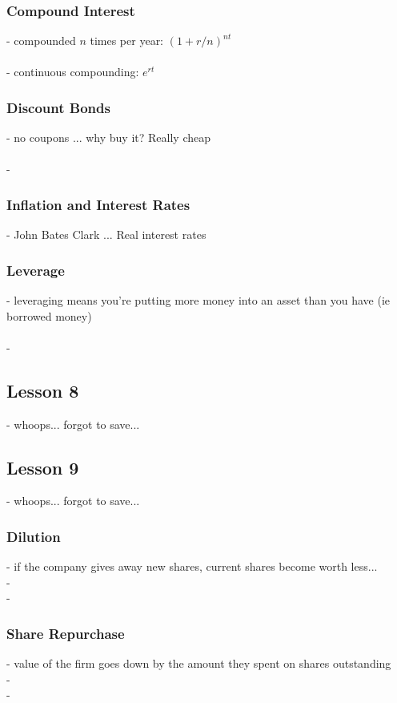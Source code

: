 \documentclass{article} %
\begin{document}
			\subsubsection*{Compound Interest}
			
			- compounded $n$ times per year: $ (1+r/n)^{nt} $ \\
			\\
			- continuous compounding: $e^{rt}$
     		
			\subsubsection*{Discount Bonds}     		
     		-  no coupons ... why buy it? Really cheap \\
     		\\
     		- 
     		\subsubsection*{Inflation and Interest Rates}
     		- John Bates Clark ... Real interest rates
     		
     		\subsubsection*{Leverage}
     		- leveraging means you're putting more money into an asset than you have (ie borrowed money) \\
     		\\
     		- 
     		
		\subsection*{Lesson 8}     
		
		- whoops... forgot to save...	
		
		\subsection*{Lesson 9}
		
		- whoops... forgot to save...   
     		
			\subsubsection*{Dilution}
     			- if the company gives away new shares, current shares become worth less... \\
     			- 	
        		  \\
     		-   	
     		\subsubsection*{Share Repurchase}
     			- value of the firm goes down by the amount they spent on shares outstanding \\
     			- 	
        		  \\
     		- 
     		
\end{document}
